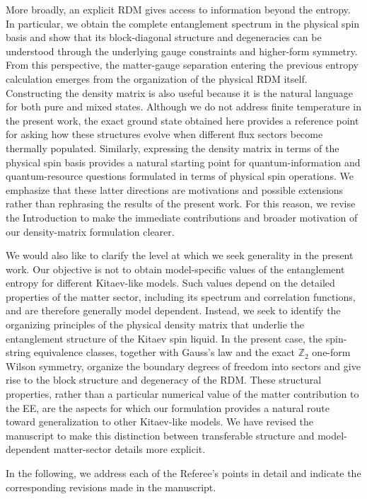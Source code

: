 \documentclass[12pt]{article}
\begin{document}
More broadly, an explicit RDM gives access to information beyond the entropy. In particular, we obtain the complete entanglement spectrum in the physical spin basis and show that its block-diagonal structure and degeneracies can be understood through the underlying gauge constraints and higher-form symmetry. From this perspective, the matter-gauge separation entering the previous entropy calculation emerges from the organization of the physical RDM itself. Constructing the density matrix is also useful because it is the natural language for both pure and mixed states. Although we do not address finite temperature in the present work, the exact ground state obtained here provides a reference point for asking how these structures evolve when different flux sectors become thermally populated. Similarly, expressing the density matrix in terms of the physical spin basis provides a natural starting point for quantum-information and quantum-resource questions formulated in terms of physical spin operations. We emphasize that these latter directions are motivations and possible extensions rather than rephrasing the results of the present work. For this reason, we revise the Introduction to make the immediate contributions and broader motivation of our density-matrix formulation clearer.

We would also like to clarify the level at which we seek generality in the present work. Our objective is not to obtain model-specific values of the entanglement entropy for different Kitaev-like models. Such values depend on the detailed properties of the matter sector, including its spectrum and correlation functions, and are therefore generally model dependent. Instead, we seek to identify the organizing principles of the physical density matrix that underlie the entanglement structure of the Kitaev spin liquid. In the present case, the spin-string equivalence classes, together with Gauss’s law and the exact $\mathbb{Z}_2$ one-form Wilson symmetry, organize the boundary degrees of freedom into sectors and give rise to the block structure and degeneracy of the RDM. These structural properties, rather than a particular numerical value of the matter contribution to the EE, are the aspects for which our formulation provides a natural route toward generalization to other Kitaev-like models. We have revised the manuscript to make this distinction between transferable structure and model-dependent matter-sector details more explicit.


In the following, we address each of the Referee's points in detail and indicate the corresponding revisions made in the manuscript.
\end{document}
